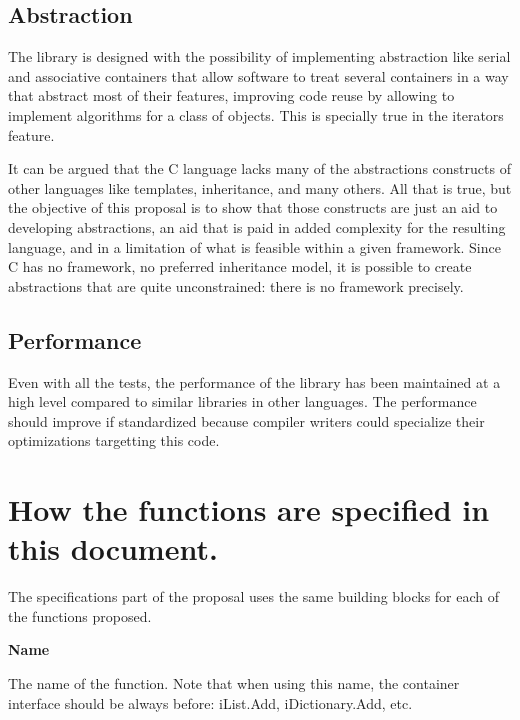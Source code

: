 \documentclass[12pt,a4paper]{memoir} %
\begin{document}
\subsection{Abstraction}
The library is designed with the possibility of implementing abstraction like serial and associative containers that allow software to treat several 
containers in a way that abstract most of their features, improving code reuse by allowing to implement algorithms for a class of objects. This is
specially true in the iterators feature.

It can be argued that the C language lacks many of the abstractions constructs of other languages like templates, inheritance, and many others.
All that is true, but the objective of this proposal is to show that those constructs are just an aid to developing abstractions, an aid that
is paid in added complexity for the resulting language, and in a limitation of what is feasible within a given framework. Since C has no 
framework, no preferred inheritance model, it is possible to create abstractions that are quite unconstrained: there is no framework precisely.
\subsection{Performance} Even with all the tests, the performance of the library has been maintained at a high level compared to similar libraries
in other languages. The performance should improve if standardized because compiler writers could specialize their optimizations targetting this
code.
\section{How the functions are specified in this document.}
The specifications part of the proposal uses the same building blocks for each of the functions proposed.\par\noindent
\textbf{Name}

\noindent The name of the function. Note that when using this name, the container interface should be always before: 
iList.Add, iDictionary.Add, etc.
\end{document}

